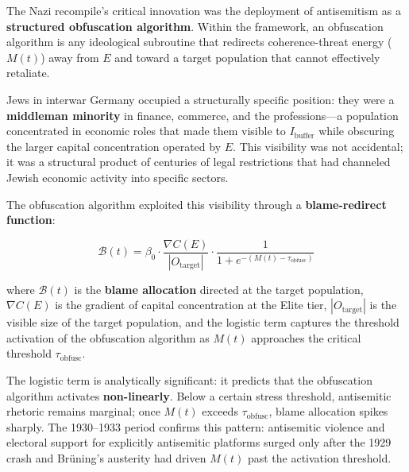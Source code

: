 The Nazi recompile's critical innovation was the deployment of antisemitism as a \textbf{structured obfuscation algorithm}. Within the framework, an obfuscation algorithm is any ideological subroutine that redirects coherence-threat energy ($M(t)$) away from $E$ and toward a target population that cannot effectively retaliate.

Jews in interwar Germany occupied a structurally specific position: they were a \textbf{middleman minority} in finance, commerce, and the professions---a population concentrated in economic roles that made them visible to $I_{\text{buffer}}$ while obscuring the larger capital concentration operated by $E$. This visibility was not accidental; it was a structural product of centuries of legal restrictions that had channeled Jewish economic activity into specific sectors.

The obfuscation algorithm exploited this visibility through a \textbf{blame-redirect function}:

\begin{equation}\label{eq:german-obfuscation}
\mathcal{B}(t) = \beta_0 \cdot \frac{\nabla C(E)}{|O_{\text{target}}|} \cdot \frac{1}{1 + e^{-(M(t) - \tau_{\text{obfusc}})}}
\end{equation}

\noindent where $\mathcal{B}(t)$ is the \textbf{blame allocation} directed at the target population, $\nabla C(E)$ is the gradient of capital concentration at the Elite tier, $|O_{\text{target}}|$ is the visible size of the target population, and the logistic term captures the threshold activation of the obfuscation algorithm as $M(t)$ approaches the critical threshold $\tau_{\text{obfusc}}$.

The logistic term is analytically significant: it predicts that the obfuscation algorithm activates \textbf{non-linearly}. Below a certain stress threshold, antisemitic rhetoric remains marginal; once $M(t)$ exceeds $\tau_{\text{obfusc}}$, blame allocation spikes sharply. The 1930--1933 period confirms this pattern: antisemitic violence and electoral support for explicitly antisemitic platforms surged only after the 1929 crash and Br\"{u}ning's austerity had driven $M(t)$ past the activation threshold.

